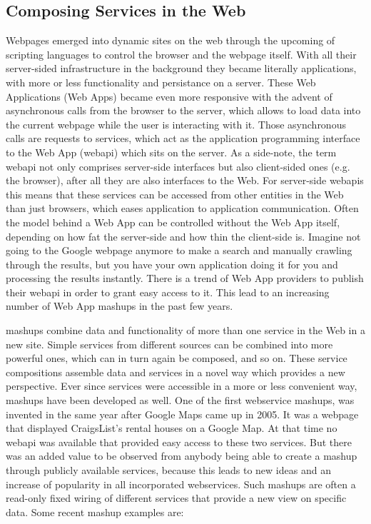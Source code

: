 \subsection{Composing Services in the Web}
Webpages emerged into dynamic sites on the web through the upcoming of scripting languages to control the browser and the webpage itself.
With all their server-sided infrastructure in the background they became literally applications, with more or less functionality and persistance on a server.
These \textrm{Web Applications (Web Apps)} became even more responsive with the advent of asynchronous calls from the browser to the server, which allows to load data into the current webpage while the user is interacting with it.
Those asynchronous calls are requests to services, which act as the application programming interface to the \textrm{Web App} (\textrm{\gls{webapi}}) which sits on the server.
As a side-note, the term \textrm{\gls{webapi}} not only comprises server-side interfaces but also client-sided ones (e.g. the browser), after all they are also interfaces to the Web.
For server-side \textrm{\gls{webapi}s} this means that these services can be accessed from other entities in the Web than just browsers, which eases application to application communication.
Often the model behind a \textrm{Web App} can be controlled without the \textrm{Web App} itself, depending on how fat the server-side and how thin the client-side is.
Imagine not going to the Google webpage anymore to make a search and manually crawling through the results, but you have your own application doing it for you and processing the results instantly.
There is a trend of \textrm{Web App} providers to publish their \textrm{\gls{webapi}} in order to grant easy access to it.
This lead to an increasing number of \textrm{Web App \glspl{mashup}} in the past few years.

\textrm{\glspl{mashup}} combine data and functionality of more than one service in the Web in a new site.
Simple services from different sources can be combined into more powerful ones, which can in turn again be composed, and so on.
These service compositions assemble data and services in a novel way which provides a new perspective.
Ever since services were accessible in a more or less convenient way, \textrm{\glspl{mashup}} have been developed as well.
One of the first \textrm{\gls{webservice} \glspl{mashup}}\cite{wwwHosuingMaps}, was invented in the same year after Google Maps came up in 2005.
It was a webpage that displayed CraigsList's rental houses on a Google Map.
At that time no \textrm{\gls{webapi}} was available that provided easy access to these two services.
But there was an added value to be observed from anybody being able to create a \textrm{\gls{mashup}} through publicly available services, because this leads to new ideas and an increase of popularity in all incorporated \textrm{\glspl{webservice}}.
Such \textrm{\glspl{mashup}} are often a read-only fixed wiring of different services that provide a new view on specific data.
Some recent \textrm{\gls{mashup}} examples are:

